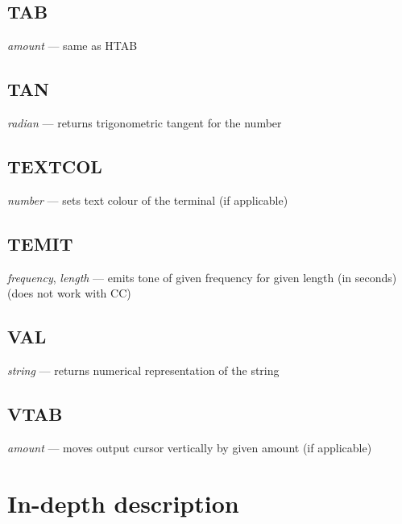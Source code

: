 \subsection{TAB} \emph{amount} --- same as HTAB
\subsection{TAN} \emph{radian} --- returns trigonometric tangent for the number
\subsection{TEXTCOL} \emph{number} --- sets text colour of the terminal (if applicable)
\subsection{TEMIT} \emph{frequency}, \emph{length} --- emits tone of given frequency for given length (in seconds) (does not work with CC)
\subsection{VAL} \emph{string} --- returns numerical representation of the string
\subsection{VTAB} \emph{amount} --- moves output cursor vertically by given amount (if applicable)

\section{In-depth description}